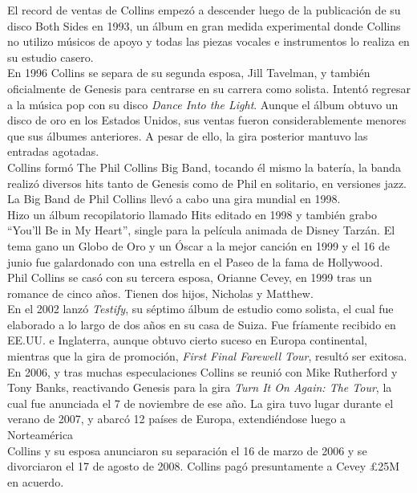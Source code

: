 \documentclass[11pt, oneside]{book}
\begin{document}
  El record de ventas de Collins empezó a descender luego de la publicación de su disco Both Sides en 1993, un álbum en gran medida experimental donde Collins no utilizo músicos de apoyo y todas las piezas vocales e instrumentos lo realiza en su estudio casero.\\

  En 1996 Collins se separa de su segunda esposa, Jill Tavelman, y también oficialmente de Genesis para centrarse en su carrera como solista. Intentó regresar a la música pop con su disco \emph{Dance Into the Light}. Aunque el álbum obtuvo un disco de oro en los Estados Unidos, sus ventas fueron considerablemente menores que sus álbumes anteriores. A pesar de ello, la gira posterior mantuvo las entradas agotadas.\\

  Collins formó The Phil Collins Big Band, tocando él mismo la batería, la banda realizó diversos hits tanto de Genesis como de Phil en solitario, en versiones jazz. La Big Band de Phil Collins llevó a cabo una gira mundial en 1998.\\

  Hizo un álbum recopilatorio llamado Hits editado en 1998 y también grabo ``You'll Be in My Heart'', single para la película animada de Disney Tarzán. El tema gano un Globo de Oro y un Óscar a la mejor canción en 1999 y el 16 de junio fue galardonado con una estrella en el Paseo de la fama de Hollywood.\\

  Phil Collins se casó con su tercera esposa, Orianne Cevey, en 1999 tras un romance de cinco años. Tienen dos hijos, Nicholas y Matthew.\\

  En el 2002 lanzó \emph{Testify}, su séptimo álbum de estudio como solista, el cual fue elaborado a lo largo de dos años en su casa de Suiza. Fue fríamente recibido en EE.UU. e Inglaterra, aunque obtuvo cierto suceso en Europa continental, mientras que la gira de promoción, \emph{First Final Farewell Tour}, resultó ser exitosa.\\

  En 2006, y tras muchas especulaciones Collins se reunió con Mike Rutherford y Tony Banks, reactivando Genesis para la gira \emph{Turn It On Again: The Tour}, la cual fue anunciada el 7 de noviembre de ese año. La gira tuvo lugar durante el verano de 2007, y abarcó 12 países de Europa, extendiéndose luego a Norteamérica\\

  Collins y su esposa anunciaron su separación el 16 de marzo de 2006 y se divorciaron el 17 de agosto de 2008. Collins pagó presuntamente a Cevey £25M en acuerdo.\\
\end{document}
